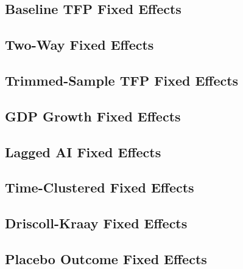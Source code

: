 \documentclass[12pt]{article}
\begin{document}
\subsection{Baseline TFP Fixed Effects}
{\scriptsize {}}

\subsection{Two-Way Fixed Effects}
{\scriptsize {}}

\subsection{Trimmed-Sample TFP Fixed Effects}
{\scriptsize {}}

\subsection{GDP Growth Fixed Effects}
{\scriptsize {}}

\subsection{Lagged AI Fixed Effects}
{\scriptsize {}}

\subsection{Time-Clustered Fixed Effects}
{\scriptsize {}}

\subsection{Driscoll-Kraay Fixed Effects}
{\scriptsize {}}

\subsection{Placebo Outcome Fixed Effects}
{\scriptsize {}}
\end{document}
